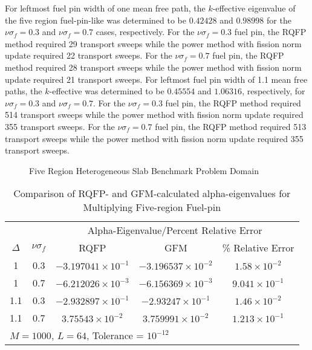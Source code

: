 For leftmost fuel pin width of one mean free path, the $k$-effective eigenvalue of the five region fuel-pin-like was determined to be $0.42428$ and $0.98998$ for the $\nu \sigma_{f} = 0.3$ and $\nu \sigma_{f} = 0.7$ cases, respectively. For the $\nu \sigma_{f} = 0.3$ fuel pin, the RQFP method required 29 transport sweeps while the power method with fission norm update required 22 transport sweeps. For the $\nu \sigma_{f} = 0.7$ fuel pin, the RQFP method required 28 transport sweeps while the power method with fission norm update required 21 transport sweeps. For leftmost fuel pin width of 1.1 mean free paths, the $k$-effective was determined to be $0.45554$ and $1.06316$, respectively, for  $\nu \sigma_{f} = 0.3$ and $\nu \sigma_{f} = 0.7$. For the $\nu \sigma_{f} = 0.3$ fuel pin, the RQFP method required 514 transport sweeps while the power method with fission norm update required 355 transport sweeps. For the $\nu \sigma_{f} = 0.7$ fuel pin, the RQFP method required 513 transport sweeps while the power method with fission norm update required 355 transport sweeps.

\begin{figure}[h]
	\centering
	
	\caption{Five Region Heterogeneous Slab Benchmark Problem Domain \cite{kornreich_timeeigenvalue_2005}}
	\label{fig:FiveRegionProblem}
\end{figure}

\begin{table*}[!htbp]
\centering{}
\caption{Comparison of RQFP- and GFM-calculated alpha-eigenvalues for Multiplying Five-region Fuel-pin}
\label{table:FiveRegionCases}
\begin{tabular}{@{}ccccc@{}}\toprule
& & \multicolumn{3}{c}{Alpha-Eigenvalue/Percent Relative Error} \\
\cmidrule{3-5} $\Delta$ & $\nu \sigma_{f}$ & RQFP & GFM & \% Relative Error \\
\midrule
1 & 0.3 & $-3.197041 \times 10^{-1}$ & $-3.196537 \times 10^{-2}$ & $1.58 \times 10^{-2}$ \\ 
1 & 0.7 & $-6.212026 \times 10^{-3}$ & $-6.156369 \times 10^{-3}$ & $9.041 \times 10^{-1}$ \\ 
1.1 & 0.3 & $-2.932897 \times 10^{-1}$ & $-2.93247 \times 10^{-1}$ & $1.46 \times 10 ^{-2}$ \\ 
1.1 & 0.7 & $3.75543 \times 10^{-2}$ & $3.759991 \times 10^{-2}$ & $1.213 \times 10^{-1}$ \\ 
\bottomrule
\multicolumn{5}{l}{$M = 1000$, $L = 64$, Tolerance = $10^{-12}$} \\
\end{tabular}
\end{table*}


